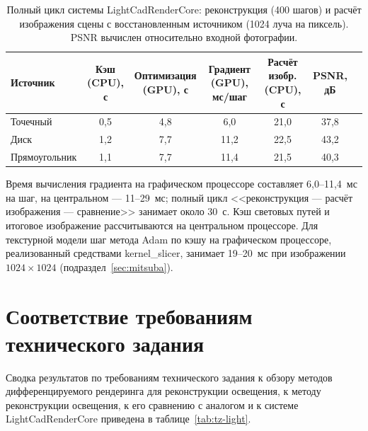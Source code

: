 \begin{table}[htbp]
    \centering
    \small
    \caption{Полный цикл системы LightCadRenderCore: реконструкция (400 шагов) и расчёт изображения сцены с восстановленным источником (1024 луча на пиксель). PSNR вычислен относительно входной фотографии.}
    \label{tab:lightcad}
    \begin{tabular}{lcccccc}
        \toprule
        Источник & \makecell{Кэш\\(CPU), с} & \makecell{Оптимизация\\(GPU), с} & \makecell{Градиент\\(GPU), мс/шаг} & \makecell{Расчёт изобр.\\(CPU), с} & \makecell{PSNR,\\дБ} \\
        \midrule[\heavyrulewidth]
        Точечный      & 0,5 & 4,8 & 6,0  & 21,0 & 37,8 \\
        Диск          & 1,2 & 7,7 & 11,2 & 22,5 & 43,2 \\
        Прямоугольник & 1,1 & 7,7 & 11,4 & 21,5 & 40,3 \\
        \bottomrule
    \end{tabular}
\end{table}

Время вычисления градиента на графическом процессоре составляет 6,0--11,4~мс на шаг, на центральном --- 11--29~мс; полный цикл <<реконструкция --- расчёт изображения --- сравнение>> занимает около 30~с. Кэш световых путей и итоговое изображение рассчитываются на центральном процессоре. Для текстурной модели шаг метода Adam по кэшу на графическом процессоре, реализованный средствами kernel\_slicer, занимает 19--20~мс при изображении $1024\times1024$ (подраздел~\ref{sec:mitsuba}).

\section{Соответствие требованиям технического задания}

Сводка результатов по требованиям технического задания к обзору методов дифференцируемого рендеринга для реконструкции освещения, к методу реконструкции освещения, к его сравнению с аналогом и к системе LightCadRenderCore приведена в таблице~\ref{tab:tz-light}.

